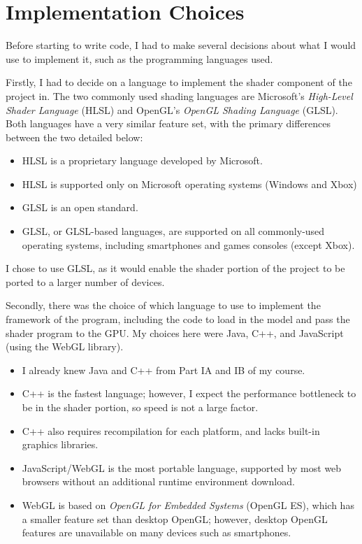 \documentclass[12pt,twoside,notitlepage]{report}
\begin{document}
\section{Implementation Choices}

Before starting to write code, I had to make several decisions about what I would use to implement it, such as the programming languages used.

Firstly, I had to decide on a language to implement the shader component of the project in. The two commonly used shading languages are Microsoft's \textit{High-Level Shader Language} (HLSL) and OpenGL's \textit{OpenGL Shading Language} (GLSL). Both languages have a very similar feature set, with the primary differences between the two detailed below:

\begin{itemize}
\item HLSL is a proprietary language developed by Microsoft.
\item HLSL is supported only on Microsoft operating systems (Windows and Xbox)
\item GLSL is an open standard.
\item GLSL, or GLSL-based languages, are supported on all commonly-used operating systems, including smartphones and games consoles (except Xbox).
\end{itemize}

I chose to use GLSL, as it would enable the shader portion of the project to be ported to a larger number of devices.

Secondly, there was the choice of which language to use to implement the framework of the program, including the code to load in the model and pass the shader program to the GPU. My choices here were Java, C++, and JavaScript (using the WebGL library).

\begin{itemize}
\item I already knew Java and C++ from Part IA and IB of my course.
\item C++ is the fastest language; however, I expect the performance bottleneck to be in the shader portion, so speed is not a large factor.
\item C++ also requires recompilation for each platform, and lacks built-in graphics libraries.
\item JavaScript/WebGL is the most portable language, supported by most web browsers without an additional runtime environment download.
\item WebGL is based on \textit{OpenGL for Embedded Systems} (OpenGL ES), which has a smaller feature set than desktop OpenGL; however, desktop OpenGL features are unavailable on many devices such as smartphones.
\end{itemize}
\end{document}
